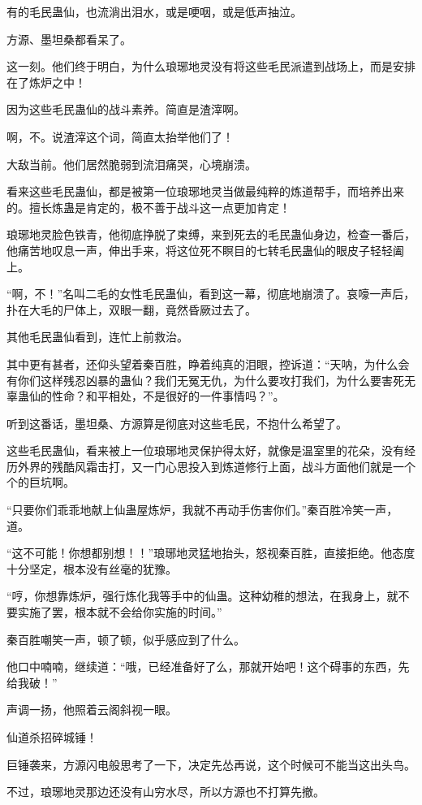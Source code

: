 \begin{this_body}
有的毛民蛊仙，也流淌出泪水，或是哽咽，或是低声抽泣。

方源、墨坦桑都看呆了。

这一刻。他们终于明白，为什么琅琊地灵没有将这些毛民派遣到战场上，而是安排在了炼炉之中！

因为这些毛民蛊仙的战斗素养。简直是渣滓啊。

啊，不。说渣滓这个词，简直太抬举他们了！

大敌当前。他们居然脆弱到流泪痛哭，心境崩溃。

看来这些毛民蛊仙，都是被第一位琅琊地灵当做最纯粹的炼道帮手，而培养出来的。擅长炼蛊是肯定的，极不善于战斗这一点更加肯定！

琅琊地灵脸色铁青，他彻底挣脱了束缚，来到死去的毛民蛊仙身边，检查一番后，他痛苦地叹息一声，伸出手来，将这位死不瞑目的七转毛民蛊仙的眼皮子轻轻阖上。

“啊，不！”名叫二毛的女性毛民蛊仙，看到这一幕，彻底地崩溃了。哀嚎一声后，扑在大毛的尸体上，双眼一翻，竟然昏厥过去了。

其他毛民蛊仙看到，连忙上前救治。

其中更有甚者，还仰头望着秦百胜，睁着纯真的泪眼，控诉道：“天呐，为什么会有你们这样残忍凶暴的蛊仙？我们无冤无仇，为什么要攻打我们，为什么要害死无辜蛊仙的性命？和平相处，不是很好的一件事情吗？”。

听到这番话，墨坦桑、方源算是彻底对这些毛民，不抱什么希望了。

这些毛民蛊仙，看来被上一位琅琊地灵保护得太好，就像是温室里的花朵，没有经历外界的残酷风霜击打，又一门心思投入到炼道修行上面，战斗方面他们就是一个个的巨坑啊。

“只要你们乖乖地献上仙蛊屋炼炉，我就不再动手伤害你们。”秦百胜冷笑一声，道。

“这不可能！你想都别想！！”琅琊地灵猛地抬头，怒视秦百胜，直接拒绝。他态度十分坚定，根本没有丝毫的犹豫。

“哼，你想靠炼炉，强行炼化我等手中的仙蛊。这种幼稚的想法，在我身上，就不要实施了罢，根本就不会给你实施的时间。”

秦百胜嘲笑一声，顿了顿，似乎感应到了什么。

他口中喃喃，继续道：“哦，已经准备好了么，那就开始吧！这个碍事的东西，先给我破！”

声调一扬，他照着云阁斜视一眼。

仙道杀招碎城锤！

巨锤袭来，方源闪电般思考了一下，决定先怂再说，这个时候可不能当这出头鸟。

不过，琅琊地灵那边还没有山穷水尽，所以方源也不打算先撤。


\end{this_body}
